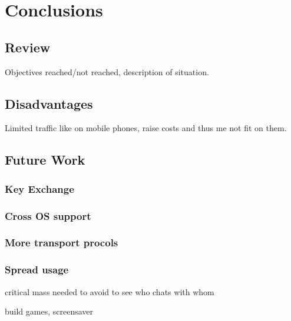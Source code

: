\section{Conclusions}
\subsection{Review}
Objectives reached/not reached, description of situation.
\subsection{Disadvantages}
Limited traffic like on mobile phones, raise costs and thus me not
fit on them.
\subsection{Future Work}
\subsubsection{Key Exchange}
\subsubsection{Cross OS support}
\subsubsection{More transport procols}
\subsubsection{Spread usage}
critical mass needed to avoid to see who chats with whom

build games, screensaver

